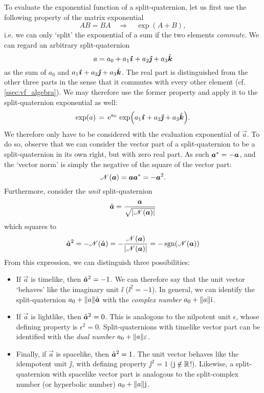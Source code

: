 To evaluate the exponential function of a split-quaternion, let us first use the following property of the matrix exponential \cite{Hall2013}
$$ AB = BA \quad \Rightarrow \quad \exp(A + B), $$
i.e. we can only `split' the exponential of a sum if the two elements \emph{commute}. We can regard an arbitrary split-quaternion
$$ a = \quat{a_0}{a_1}{a_2}{a_3} $$
as the sum of $a_0$ and $\quatvec{a_1}{a_2}{a_3}$. The real part is distinguished from the other three parts in the sense that it commutes
with every other element (cf. \cref{ssec:vf_algebra}). We may therefore use the former property and apply it to the split-quaternion exponential as well:
$$ \exp(a) \, = \,\ec^{a_0}\,\exp(\quatvec{a_1}{a_2}{a_3}). $$
We therefore only have to be considered with the evaluation exponential of $\vec{a}$. To do so, observe that we can consider the vector part of a split-quaternion to be a split-quaternion in its own right, but with zero real part. As such $ \conj{\vec{a}} = -\vec{a} $, and the `vector norm' is simply the negative of the square of the vector part:
$$ \mathscr{N}(\vec{a}) = \vec{a} \conj{\vec{a}} = -\vec{a}^2. $$
Furthermore, consider the \emph{unit} split-quaternion
$$ \hat{\vec{a}} = \frac{\vec{a}}{\sqrt{\abs{\mathscr{N}(\vec{a})}}} $$
which squares to
$$ \hat{\vec{a}}^2 = - \mathscr{N}(\hat{\vec{a}}) 
                   = - \frac{\mathscr{N}(\vec{a})}{\abs{\mathscr{N}(\vec{a})}} 
                   = - \sgn(\mathscr{N}(\vec{a}))
$$
From this expression, we can distinguish three possibilities: \cite{Motter1998,Harkin2004}
\begin{itemize}
    \item If $\vec{a}$ is timelike, then $\uvec{a}^2 = -1$. We can therefore say that the unit vector `behaves' like the imaginary unit $\ii$ ($\ii^2 = -1$). In general, we can identify the split-quaternion $ a_0 + \norm{a}\uvec{a}$ with the \emph{complex number} $a_0 + \norm{a}\mathrm{i}$. 
    \item If $\vec{a}$ is lightlike, then $\uvec{a}^2 = 0$. This is analogous to the nilpotent unit $\epsilon$, whose defining property is $ \epsilon^2 = 0$. Split-quaternions with timelike vector part can be identified with the \emph{dual number} $a_0 + \norm{a}\varepsilon$. 
    \item Finally, if $\vec{a}$ is spacelike, then $\uvec{a}^2 = 1$. The unit vector behaves like the idempotent unit $\jj$, with defining property $\jj^2 = 1$ ($\mathrm{j} \notin \mathbb{R}$!). Likewise, a split-quaternion with spacelike vector part is analogous to the split-complex number (or hyperbolic number) $a_0 + \norm{a}\mathrm{j}$.
\end{itemize}
